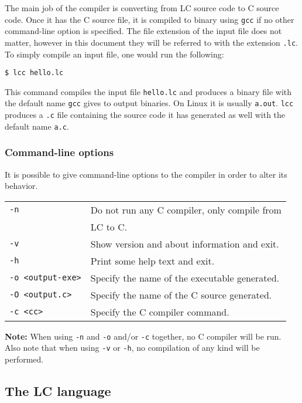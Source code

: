 \documentclass[12pt]{article}
\begin{document}
The main job of the compiler is converting from LC source code to C source code.
Once it has the C source file, it is compiled to binary using \texttt{gcc} if no
other command-line option is specified. The file extension of the input file
does not matter, however in this document they will be referred to with the
extension \texttt{.lc}. To simply compile an input file, one would run the
following:
\begin{lstlisting}
$ lcc hello.lc
\end{lstlisting}
This command compiles the input file \texttt{hello.lc} and produces a binary
file with the default name \texttt{gcc} gives to output binaries. On Linux it is
usually \texttt{a.out}. \texttt{lcc} produces a \texttt{.c} file containing the
source code it has generated as well with the default name \texttt{a.c}.

\subsubsection{Command-line options}

It is possible to give command-line options to the compiler in order to alter
its behavior. 

\vspace{7pt}

\begin{tabular}{l l}
    \texttt{-n}\quad& Do not run any C compiler, only compile from \\ 
                    & LC to C. \\
    \texttt{-v}\quad& Show version and about information and exit. \\
    \texttt{-h}\quad& Print some help text and exit. \\
    \texttt{-o <output-exe>}\quad& Specify the name of the executable
        generated. \\
    \texttt{-O <output.c>}\quad& Specify the name of the C source generated. \\
    \texttt{-c <cc>}\quad& Specify the C compiler command.
\end{tabular}

\vspace{8pt}

\textbf{Note:} When using \texttt{-n} and \texttt{-o} and/or \texttt{-c} together,
no C compiler will be run. Also note that when using \texttt{-v} or \texttt{-h},
no compilation of any kind will be performed. 

\subsection{The LC language}
\end{document}
